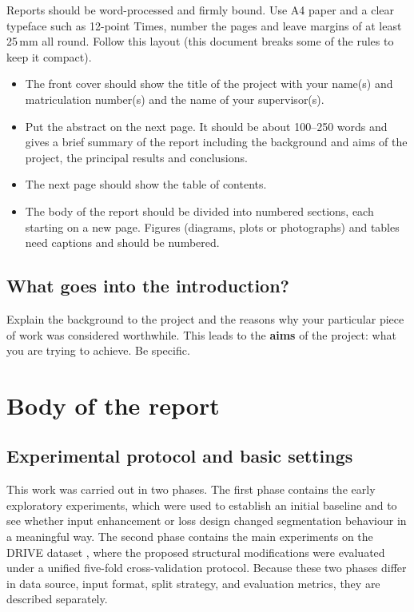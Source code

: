 \documentclass[a4paper,12pt]{article}
\begin{document}
Reports should be word-processed and firmly bound. Use A4 paper and a clear typeface such as 12-point Times, number the pages and leave margins of at least 25\,mm all round. Follow this layout (this document breaks some of the rules to keep it compact).
\begin{itemize}
\item
The front cover should show the title of the project with your name(s) and matriculation number(s) and the name of your supervisor(s).
\item
Put the abstract on the next page. It should be about 100--250 words and gives a brief summary of the report including the background and aims of the project, the principal results and conclusions.
\item
The next page should show the table of contents. 
\item
The body of the report should be divided into numbered sections, each starting on a new page. Figures (diagrams, plots or photographs) and tables need captions and should be numbered.
\end{itemize}

\subsection{What goes into the introduction?}

Explain the background to the project and the reasons why your particular piece of work was considered worthwhile. This leads to the \textbf{aims} of the project: what you are trying to achieve. Be specific.


\section{Body of the report}

\subsection{Experimental protocol and basic settings}

This work was carried out in two phases. The first phase contains the early exploratory experiments, which were used to establish an initial baseline and to see whether input enhancement or loss design changed segmentation behaviour in a meaningful way. The second phase contains the main experiments on the DRIVE dataset \cite{staal2004drive}, where the proposed structural modifications were evaluated under a unified five-fold cross-validation protocol. Because these two phases differ in data source, input format, split strategy, and evaluation metrics, they are described separately.
\end{document}
